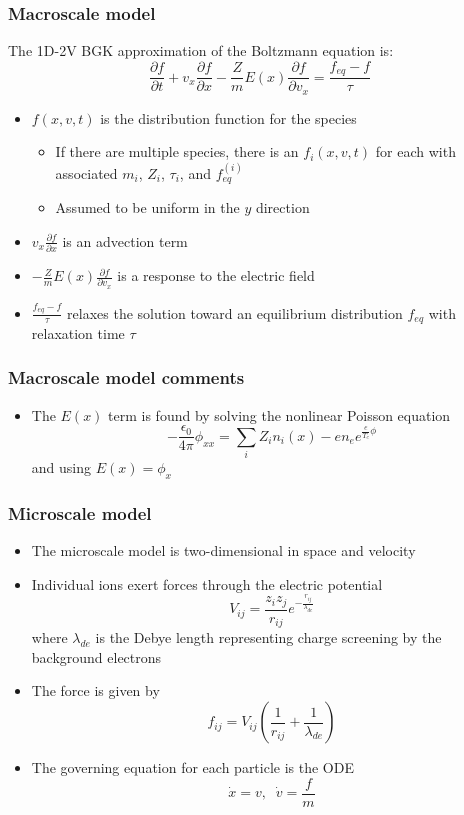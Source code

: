 \documentclass{beamer}
\begin{document}
\begin{frame}
\frametitle{Macroscale model}
The 1D-2V BGK approximation of the Boltzmann equation is:
\[\frac{\partial f}{\partial t}+v_x\frac{\partial f}{\partial x}-\frac{Z}{m}E(x)\frac{\partial f}{\partial v_x}=\frac{f_{eq}-f}{\tau}
\]\begin{itemize}
\item $f(x,v,t)$ is the distribution function for the species\vspace{0.5em}
\begin{itemize}
\item If there are multiple species, there is an $f_i(x,v,t)$ for each with associated $m_i$, $Z_i$, $\tau_i$, and $f_{eq}^{(i)}$\vspace{0.5em}
\item Assumed to be uniform in the $y$ direction\vspace{1em}
\end{itemize}
\item $v_x\frac{\partial f}{\partial x}$ is an advection term\vspace{0.5em}
\item $-\frac{Z}{m}E(x)\frac{\partial f}{\partial v_x}$ is a response to the electric field\vspace{0.5em}
\item $\frac{f_{eq}-f}{\tau}$ relaxes the solution toward an equilibrium distribution $f_{eq}$ with relaxation time $\tau$
\end{itemize}
\end{frame}

\begin{frame}
\frametitle{Macroscale model comments}
\begin{itemize}
\item The $E(x)$ term is found by solving the nonlinear Poisson equation
\[-\frac{\epsilon_0}{4\pi}\phi_{xx}=\sum_iZ_in_i(x)-en_ee^{\frac{e}{T_e}\phi}
\]and using $E(x)=\phi_x$\vspace{1em}

\end{itemize}
\end{frame}


\begin{frame}
\frametitle{Microscale model}
\begin{itemize}
\item The microscale model is two-dimensional in space and velocity\vspace{0.5em}
\item Individual ions exert forces through the electric potential
\[V_{ij}=\frac{z_iz_j}{r_{ij}}e^{-\frac{r_{ij}}{\lambda_{de}}}
\]where $\lambda_{de}$ is the Debye length representing charge screening by the background electrons \vspace{0.5em}
\item The force is given by
\[f_{ij}=V_{ij}\left(\frac{1}{r_{ij}}+\frac{1}{\lambda_{de}}\right)
\]
\item The governing equation for each particle is the ODE
\[\dot{x}=v,\;\;\dot{v}=\frac{f}{m}
\]
\end{itemize}
\end{frame}
\end{document}
